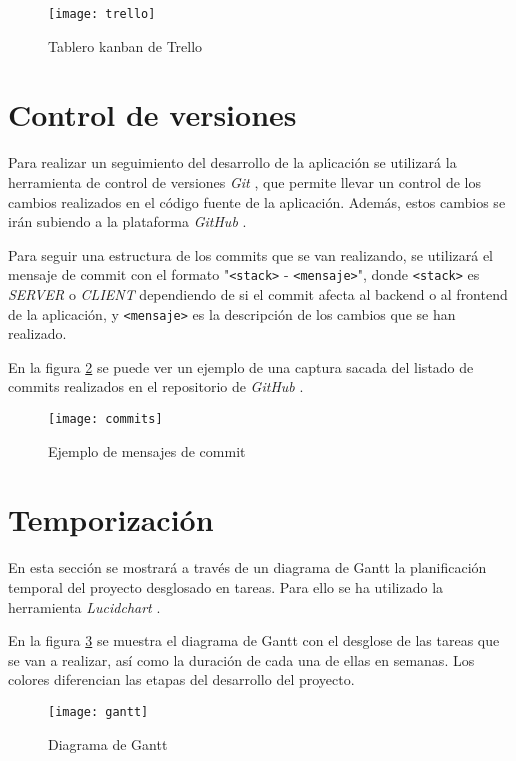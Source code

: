 \begin{figure}[H]
  \centering
  \texttt{[image: trello]}
  \caption{Tablero kanban de Trello}
  \label{fig:trello}
\end{figure}

\section{Control de versiones}
Para realizar un seguimiento del desarrollo de la aplicación se utilizará la
herramienta de control de versiones \textit{Git} \cite{git}, que permite llevar un
control de los cambios realizados en el código fuente de la aplicación. Además, estos
cambios se irán subiendo a la plataforma \textit{GitHub} \cite{github}.

Para seguir una estructura de los commits que se van realizando, se utilizará
el mensaje de commit con el formato "\texttt{<stack>} - \texttt{<mensaje>}", donde \texttt{<stack>}
es \textit{SERVER} o \textit{CLIENT} dependiendo de si el commit afecta al backend o
al frontend de la aplicación, y \texttt{<mensaje>} es la descripción de los cambios que
se han realizado.

En la figura \ref{fig:commits} se puede ver un ejemplo de una captura sacada
del listado de commits realizados en el repositorio de \textit{GitHub} \cite{github}.

\begin{figure}[H]
  \centering
  \texttt{[image: commits]}
  \caption{Ejemplo de mensajes de commit}
  \label{fig:commits}
\end{figure}

\section{Temporización}
En esta sección se mostrará a través de un diagrama de Gantt la planificación
temporal del proyecto desglosado en tareas. Para ello se ha utilizado la
herramienta \textit{Lucidchart} \cite{lucidchart}.

En la figura \ref{fig:gantt} se muestra el diagrama de Gantt con el desglose de las
tareas que se van a realizar, así como la duración de cada una de ellas en semanas.
Los colores diferencian las etapas del desarrollo del proyecto.
\begin{figure}[H]
  \centering
  \texttt{[image: gantt]}
  \caption{Diagrama de Gantt}
  \label{fig:gantt}
\end{figure}

